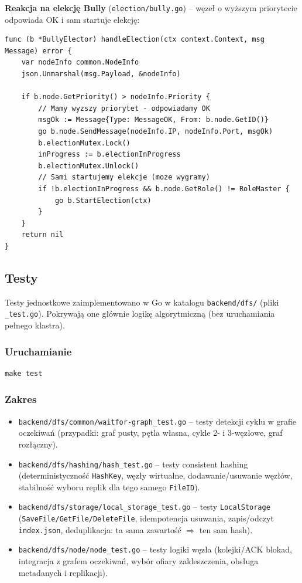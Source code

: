 \documentclass[12pt,a4paper]{article}
\begin{document}
	\textbf{Reakcja na elekcję Bully} (\texttt{election/bully.go}) -- węzeł o wyższym priorytecie odpowiada OK i sam startuje elekcję:
	\begin{lstlisting}
func (b *BullyElector) handleElection(ctx context.Context, msg Message) error {
    var nodeInfo common.NodeInfo
    json.Unmarshal(msg.Payload, &nodeInfo)

    if b.node.GetPriority() > nodeInfo.Priority {
        // Mamy wyzszy priorytet - odpowiadamy OK
        msgOk := Message{Type: MessageOK, From: b.node.GetID()}
        go b.node.SendMessage(nodeInfo.IP, nodeInfo.Port, msgOk)
        b.electionMutex.Lock()
        inProgress := b.electionInProgress
        b.electionMutex.Unlock()
        // Sami startujemy elekcje (moze wygramy)
        if !b.electionInProgress && b.node.GetRole() != RoleMaster {
            go b.StartElection(ctx)
        }
    }
    return nil
}
	\end{lstlisting}
	\subsection{Testy}
	Testy jednostkowe zaimplementowano w Go w katalogu \texttt{backend/dfs/} (pliki \texttt{\_test.go}). Pokrywają one głównie logikę algorytmiczną (bez uruchamiania pełnego klastra).

	\subsubsection{Uruchamianie}
	\begin{verbatim}
make test
	\end{verbatim}

	\subsubsection{Zakres}
	\begin{itemize}
		\item \texttt{backend/dfs/common/waitfor-graph\_test.go} -- testy detekcji cyklu w grafie oczekiwań (przypadki: graf pusty, pętla własna, cykle 2- i 3-węzłowe, graf rozłączny).
		\item \texttt{backend/dfs/hashing/hash\_test.go} -- testy consistent hashing (deterministyczność \texttt{HashKey}, węzły wirtualne, dodawanie/usuwanie węzłów, stabilność wyboru replik dla tego samego \texttt{FileID}).
		\item \texttt{backend/dfs/storage/local\_storage\_test.go} -- testy \texttt{LocalStorage} (\texttt{SaveFile/GetFile/DeleteFile}, idempotencja usuwania, zapis/odczyt \texttt{index.json}, deduplikacja: ta sama zawartość $\Rightarrow$ ten sam hash).
		\item \texttt{backend/dfs/node/node\_test.go} -- testy logiki węzła (kolejki/ACK blokad, integracja z grafem oczekiwań, wybór ofiary zakleszczenia, obsługa metadanych i replikacji).
	\end{itemize}
\end{document}
